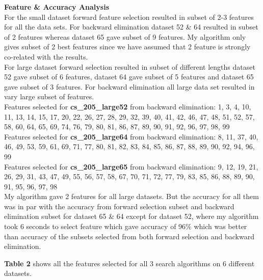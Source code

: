 \documentclass[a4paper, 11pt]{article}
\begin{document}
\noindent\textbf{Feature \& Accuracy Analysis}\\
For the small dataset forward feature selection resulted in subset of 2-3 features for all the data sets. For backward elimination dataset 52 \& 64 resulted in subset of 2 features whereas dataset 65 gave subset of 9 features. My algorithm only gives subset of 2 best features since we have assumed that 2 feature is strongly co-related with the results. \\
For large dataset forward selection resulted in subset of different lengths dataset 52 gave subset of 6 features, dataset 64 gave subset of 5 features and dataset 65 gave subset of 3 features. For backward elimination all large data set resulted in vary large subset of features. \\

Features selected for \textbf{cs\_205\_large52} from backward elimination: {1, 3, 4, 10, 11, 13, 14, 15, 17, 20, 22, 26, 27, 28, 29, 32, 39, 40, 41, 42, 46, 47, 48, 51, 52, 57, 58, 60, 64, 65, 69, 74, 76, 79, 80, 81, 86, 87, 89, 90, 91, 92, 96, 97, 98, 99 }\\

Features selected for \textbf{cs\_205\_large64} from backward elimination:
{8, 11, 37, 40, 46, 49, 53, 59, 61, 69, 71, 77, 80, 81, 82, 83, 84, 85, 86, 87, 88, 89, 90, 92, 94, 96, 99 }\\

Features selected for \textbf{cs\_205\_large65} from backward elimination: {9, 12, 19, 21, 26, 29, 31, 43, 47, 49, 55, 56, 57, 58, 67, 70, 71, 72, 77, 79, 83, 85, 86, 88, 89, 90, 91, 95, 96, 97, 98 }\\

\noindent My algorithm gave 2 features for all large datasets. But the accuracy for all them was in par with the accuracy from forward selection subset and backward elimination subset for dataset 65 \& 64 except for dataset 52, where my algorithm took 6 seconds to select feature which gave accuracy of 96\% which was better than accuracy of the subsets selected from both forward selection and backward elimination.

\textbf{Table 2} shows all the features selected for all 3 search algorithms on 6 different datasets.\\
\end{document}

